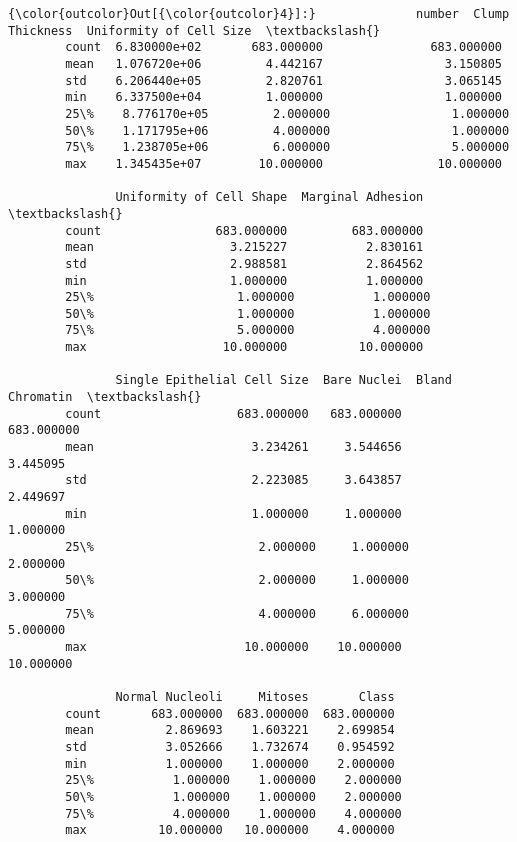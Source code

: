 \documentclass[11pt]{article}
\begin{document}
\begin{Verbatim}[commandchars=\\\{\}]
{\color{outcolor}Out[{\color{outcolor}4}]:}              number  Clump Thickness  Uniformity of Cell Size  \textbackslash{}
        count  6.830000e+02       683.000000               683.000000   
        mean   1.076720e+06         4.442167                 3.150805   
        std    6.206440e+05         2.820761                 3.065145   
        min    6.337500e+04         1.000000                 1.000000   
        25\%    8.776170e+05         2.000000                 1.000000   
        50\%    1.171795e+06         4.000000                 1.000000   
        75\%    1.238705e+06         6.000000                 5.000000   
        max    1.345435e+07        10.000000                10.000000   
        
               Uniformity of Cell Shape  Marginal Adhesion  \textbackslash{}
        count                683.000000         683.000000   
        mean                   3.215227           2.830161   
        std                    2.988581           2.864562   
        min                    1.000000           1.000000   
        25\%                    1.000000           1.000000   
        50\%                    1.000000           1.000000   
        75\%                    5.000000           4.000000   
        max                   10.000000          10.000000   
        
               Single Epithelial Cell Size  Bare Nuclei  Bland Chromatin  \textbackslash{}
        count                   683.000000   683.000000       683.000000   
        mean                      3.234261     3.544656         3.445095   
        std                       2.223085     3.643857         2.449697   
        min                       1.000000     1.000000         1.000000   
        25\%                       2.000000     1.000000         2.000000   
        50\%                       2.000000     1.000000         3.000000   
        75\%                       4.000000     6.000000         5.000000   
        max                      10.000000    10.000000        10.000000   
        
               Normal Nucleoli     Mitoses       Class  
        count       683.000000  683.000000  683.000000  
        mean          2.869693    1.603221    2.699854  
        std           3.052666    1.732674    0.954592  
        min           1.000000    1.000000    2.000000  
        25\%           1.000000    1.000000    2.000000  
        50\%           1.000000    1.000000    2.000000  
        75\%           4.000000    1.000000    4.000000  
        max          10.000000   10.000000    4.000000  
\end{Verbatim}
            
\end{document}
